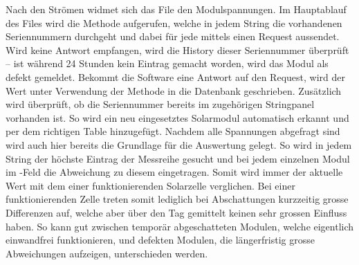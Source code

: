 {\begin{a3pages}
{\begin{minipage}{135mm}
    Nach  den   Str\"omen  widmet   sich  das  File   den  Modulspannungen. Im
    Hauptablauf  des  Files  wird  die  Methode  
    aufgerufen,  welche   in  jedem   String  die   vorhandenen  Seriennummern
    durchgeht  und dabei  f\"ur  jede mittels  
    einen   Request  aussendet. Wird   keine  Antwort   empfangen,  wird   die
    History   dieser  Seriennummer   \"uberpr\"uft   –   ist  w\"ahrend   24
    Stunden  kein   Eintrag  gemacht  worden,   wird  das  Modul   als  defekt
    gemeldet. Bekommt  die Software  eine Antwort  auf den  Request, wird  der
    Wert  unter  Verwendung  der  Methode  
    in   die  Datenbank   geschrieben. Zus\"atzlich  wird   \"uberpr\"uft,  ob
    die   Seriennummer   bereits   im  zugeh\"origen   Stringpanel   vorhanden
    ist. So  wird   ein  neu   eingesetztes  Solarmodul   automatisch  erkannt
    und   per     dem   richtigen   Table
    hinzugef\"ugt. Nachdem  alle  Spannungen  abgefragt sind  wird  auch  hier
    bereits die Grundlage f\"ur die Auswertung gelegt. So wird in jedem String
    der h\"ochste Eintrag der Messreihe  gesucht und bei jedem einzelnen Modul
    im  -Feld  die  Abweichung  zu  diesem  eingetragen. Somit
    wird immer  der aktuelle  Wert mit  dem einer  funktionierenden Solarzelle
    verglichen. Bei einer  funktionierenden Zelle  treten somit  lediglich bei
    Abschattungen  kurzzeitig  grosse  Differenzen  auf,  welche  aber  \"uber
    den  Tag  gemittelt  keinen  sehr  grossen  Einfluss  haben. So  kann  gut
    zwischen tempor\"ar abgeschatteten  Modulen, welche eigentlich einwandfrei
    funktionieren,   und   defekten   Modulen,  die   l\"angerfristig   grosse
    Abweichungen aufzeigen, unterschieden werden.

    \vspace*{5mm}

    \hfill{}
\end{minipage}}
\hspace*{25mm}

\end{a3pages}}



